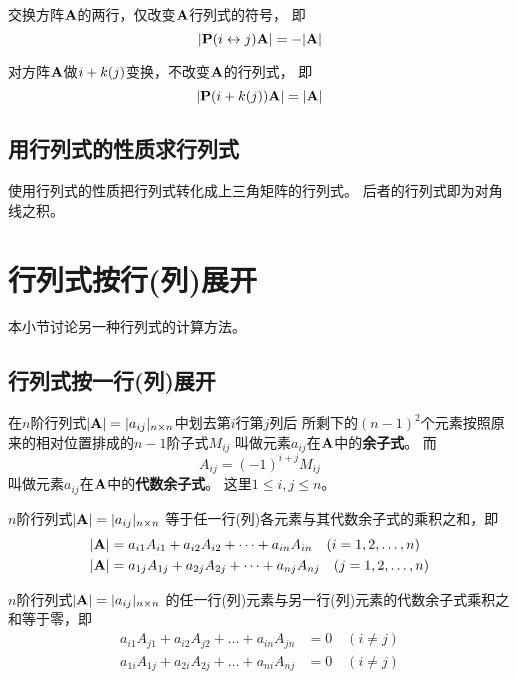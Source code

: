 \begin{theorem} \label{thrm:det-rowswi}
  交换方阵$\mathbf{A}$的两行，仅改变$\mathbf{A}$行列式的符号，
  即\[ |\mathbf{P}(i \leftrightarrow j)\mathbf{A}| = -|\mathbf{A}| \]
\end{theorem}

\begin{theorem} \label{thrm:det-rowadd}
  对方阵$\mathbf{A}$做$i +k (j)$变换，不改变$\mathbf{A}$的行列式，
  即\[ |\mathbf{P}(i +k (j))\mathbf{A}| = |\mathbf{A}| \]
\end{theorem}

\subsection{用行列式的性质求行列式}
使用行列式的性质把行列式转化成上三角矩阵的行列式。
后者的行列式即为对角线之积。

\section{行列式按行(列)展开}
本小节讨论另一种行列式的计算方法。

\subsection{行列式按一行(列)展开}
\begin{definition}[余子式]
  在$n$阶行列式$|\mathbf{A}|=|a_{ij}|_{n\times n}$中划去第$i$行第$j$列后
  所剩下的$(n-1)^2$个元素按照原来的相对位置排成的$n-1$阶子式$M_{ij}$
  叫做元素$a_{ij}$在$\mathbf{A}$中的\textbf{余子式}。
  而\[ A_{ij} = (-1)^{i+j}M_{ij} \]
  叫做元素$a_{ij}$在$\mathbf{A}$中的\textbf{代数余子式}。
  这里$1\le i, j \le n$。
\end{definition}

\begin{theorem}[按行(列)展开] \label{thrm:det-expansion}
  $n$阶行列式$|\mathbf{A}|=|a_{ij}|_{n\times n}$
  等于任一行(列)各元素与其代数余子式的乘积之和，即
  \begin{align*}
  |\mathbf{A}| &= a_{i1}A_{i1}+a_{i2}A_{i2}+\dots+a_{in}A_{in}\quad(i=1,2,\dots,n) \\
  |\mathbf{A}| &= a_{1j}A_{1j}+a_{2j}A_{2j}+\dots+a_{nj}A_{nj}\quad(j=1,2,\dots,n)
  \end{align*}
\end{theorem}

\begin{theorem} \label{thrm:det-expansion-zero}
  $n$阶行列式$|\mathbf{A}|=|a_{ij}|_{n\times n}$
  的任一行(列)元素与另一行(列)元素的代数余子式乘积之和等于零，即
  \begin{align*}
    a_{i1}A_{j1}+a_{i2}A_{j2}+\dots+a_{in}A_{jn} &= 0\quad(i\neq j) \\
    a_{1i}A_{1j}+a_{2i}A_{2j}+\dots+a_{ni}A_{nj} &= 0\quad(i\neq j)
  \end{align*}
\end{theorem}


